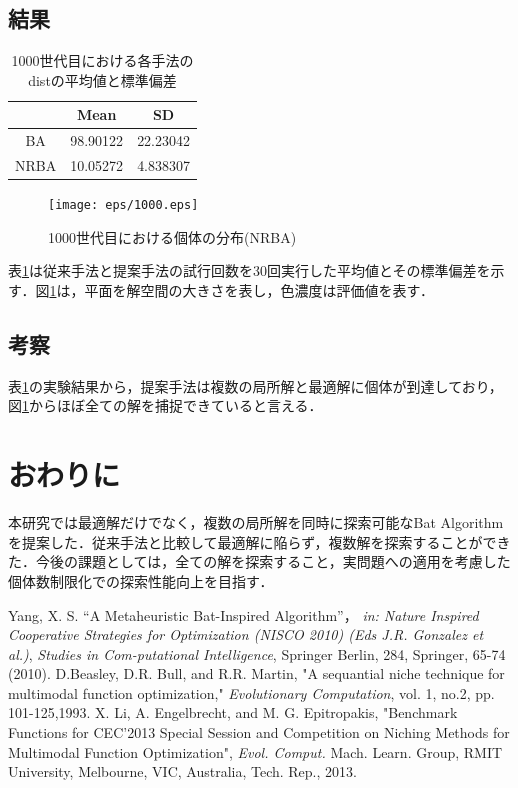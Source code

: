 \documentclass[twocolumn, a4paper]{UECIEresume}
\begin{document}
\subsection{結果}
\begin{table}
\begin{center}
\caption{1000世代目における各手法のdistの平均値と標準偏差}
\label{tab}
\begin{tabular}{ccc}\hline
 & Mean & SD\\  \hline\hline
BA & 98.90122 & 22.23042 \\ 
NRBA & 10.05272 & 4.838307 \\ \hline
\end{tabular}
\end{center}
\end{table}
\begin{figure}[t]
\begin{center}
\texttt{[image: eps/1000.eps]}
\caption{1000世代目における個体の分布(NRBA)}
\label{fig:1000}
\end{center}
\end{figure}

表\ref{tab}は従来手法と提案手法の試行回数を30回実行した平均値とその標準偏差を示す．図\ref{fig:1000}は，平面を解空間の大きさを表し，色濃度は評価値を表す．

\subsection{考察}
表\ref{tab}の実験結果から，提案手法は複数の局所解と最適解に個体が到達しており，図\ref{fig:1000}からほぼ全ての解を捕捉できていると言える．
\section{おわりに}
本研究では最適解だけでなく，複数の局所解を同時に探索可能なBat Algorithmを提案した．従来手法と比較して最適解に陥らず，複数解を探索することができた．今後の課題としては，全ての解を探索すること，実問題への適用を考慮した個体数制限化での探索性能向上を目指す．
{\small
\begin{thebibliography}{*}
 Yang, X. S. “A Metaheuristic Bat-Inspired Algorithm”， {\it in: Nature Inspired Cooperative Strategies for Optimization (NISCO 2010) (Eds J.R. Gonzalez et al.)}, {\it Studies in Com-putational Intelligence}, Springer Berlin, 284, Springer, 65-74 (2010).
 D.Beasley, D.R. Bull, and R.R. Martin, "A sequantial niche technique for multimodal function optimization," {\it Evolutionary Computation}, vol. 1, no.2, pp. 101-125,1993.
 X. Li, A. Engelbrecht, and M. G. Epitropakis, "Benchmark Functions for CEC'2013 Special Session and Competition on Niching Methods for Multimodal Function Optimization", {\it Evol. Comput.} Mach. Learn. Group, RMIT University, Melbourne, VIC, Australia, Tech. Rep., 2013.
\end{thebibliography}
}
\end{document}
